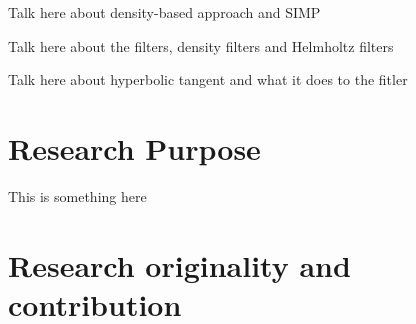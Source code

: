 \documentclass[../main.tex]{subfiles}
\begin{document}
Talk here about density-based approach and SIMP 

Talk here about the filters, density filters and Helmholtz filters

Talk here about hyperbolic tangent and what it does to the fitler


\section{Research Purpose}
 
This is something here

\section{Research originality and contribution}
\end{document}
